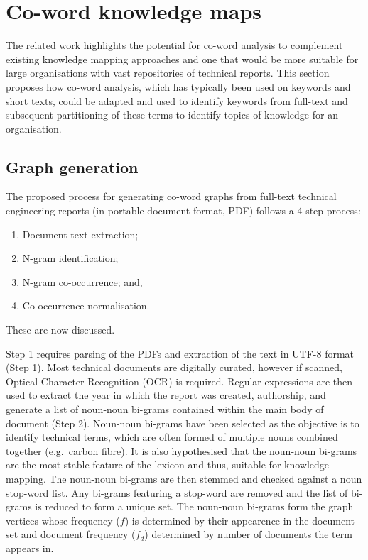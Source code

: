 \documentclass[a4paper, 11pt]{article}
\begin{document}
\section{Co-word knowledge maps}\label{sec:km}

The related work highlights the potential for co-word analysis to complement existing knowledge mapping approaches and one that would be more suitable for large organisations with vast repositories of technical reports. 
This section proposes how co-word analysis, which has typically been used on keywords and short texts, could be adapted and used to identify keywords from full-text and subsequent partitioning of these terms to identify topics of knowledge for an organisation.

\subsection{Graph generation}

The proposed process for generating co-word graphs from full-text technical engineering reports (in portable document format, PDF) follows a 4-step process:

\begin{enumerate}
  \item Document text extraction;
  \item N-gram identification;
  \item N-gram co-occurrence; and,
  \item Co-occurrence normalisation.
\end{enumerate}

These are now discussed.

Step 1 requires parsing of the PDFs and extraction of the text in UTF-8 format (Step 1).
Most technical documents are digitally curated, however if scanned, Optical Character Recognition (OCR) is required.
Regular expressions are then used to extract the year in which the report was created, authorship, and generate a list of noun-noun bi-grams contained within the main body of document (Step 2). Noun-noun bi-grams have been selected as the objective is to identify technical terms, which are often formed of multiple nouns combined together (e.g.\ carbon fibre). It is also hypothesised that the noun-noun bi-grams are the most stable feature of the lexicon and thus, suitable for knowledge mapping. The noun-noun bi-grams are then stemmed and checked against a noun stop-word list. Any bi-grams featuring a stop-word are removed and the list of bi-grams is reduced to form a unique set. The noun-noun bi-grams form the graph vertices whose frequency ($f$) is determined by their appearence in the document set and document frequency ($f_d$) determined by number of documents the term appears in.
\end{document}
